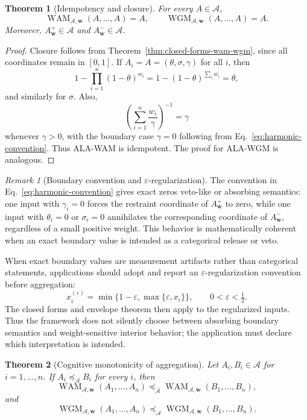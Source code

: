 \documentclass[reqno,final]{amsart}
\theoremstyle{definition}
\theoremstyle{plain}
\newtheorem{theorem}{Theorem}
\theoremstyle{remark}
\newtheorem{remark}{Remark}
\providecommand{\cA}{\mathcal{A}}
\providecommand{\preceqA}{\preceq_{\mathcal A}}
\begin{document}
\begin{theorem}[Idempotency and closure]
\label{thm:aggregation-idempotency}
For every \(A\in\cA\),
\[
\operatorname{WAM}_{\cA,\mathbf{w}}(A,\ldots,A)=A,
\qquad
\operatorname{WGM}_{\cA,\mathbf{w}}(A,\ldots,A)=A.
\]
Moreover, \(A_{\mathbf{w}}^{+}\in\cA\) and \(A_{\mathbf{w}}^{-}\in\cA\).
\end{theorem}

\begin{proof}
Closure follows from Theorem~\ref{thm:closed-forms-wam-wgm}, since all coordinates remain in \([0,1]\). If \(A_i=A=(\theta,\sigma,\gamma)\) for all \(i\), then
\[
1-\prod_{i=1}^{n}(1-\theta)^{w_i}=1-(1-\theta)^{\sum_iw_i}=\theta,
\]
and similarly for \(\sigma\). Also,
\[
\left(\sum_{i=1}^{n}\frac{w_i}{\gamma}\right)^{-1}=\gamma
\]
whenever \(\gamma>0\), with the boundary case \(\gamma=0\) following from Eq.~\eqref{eq:harmonic-convention}. Thus ALA-WAM is idempotent. The proof for ALA-WGM is analogous.
\end{proof}

\begin{remark}[Boundary convention and \(\varepsilon\)-regularization]
\label{rem:boundary-aggregation}
The convention in Eq.~\eqref{eq:harmonic-convention} gives exact zeros veto-like or absorbing semantics: one input with \(\gamma_i=0\) forces the restraint coordinate of \(A^{+}_{\mathbf w}\) to zero, while one input with \(\theta_i=0\) or \(\sigma_i=0\) annihilates the corresponding coordinate of \(A^{-}_{\mathbf w}\), regardless of a small positive weight. This behavior is mathematically coherent when an exact boundary value is intended as a categorical release or veto.

When exact boundary values are measurement artifacts rather than categorical statements, applications should adopt and report an \(\varepsilon\)-regularization convention before aggregation:
\[
x_i^{(\varepsilon)}
=
\min\{1-\varepsilon,\max\{\varepsilon,x_i\}\},
\qquad
0<\varepsilon<\tfrac12.
\]
The closed forms and envelope theorem then apply to the regularized inputs. Thus the framework does not silently choose between absorbing boundary semantics and weight-sensitive interior behavior; the application must declare which interpretation is intended.
\end{remark}

\begin{theorem}[Cognitive monotonicity of aggregation]
\label{thm:aggregation-monotonicity}
Let \(A_i,B_i\in\cA\) for \(i=1,
\ldots,n\). If \(A_i\preceqA B_i\) for every \(i\), then
\[
\operatorname{WAM}_{\cA,\mathbf{w}}(A_1,\ldots,A_n)
\preceqA
\operatorname{WAM}_{\cA,\mathbf{w}}(B_1,\ldots,B_n),
\]
and
\[
\operatorname{WGM}_{\cA,\mathbf{w}}(A_1,\ldots,A_n)
\preceqA
\operatorname{WGM}_{\cA,\mathbf{w}}(B_1,\ldots,B_n).
\]
\end{theorem}
\end{document}
